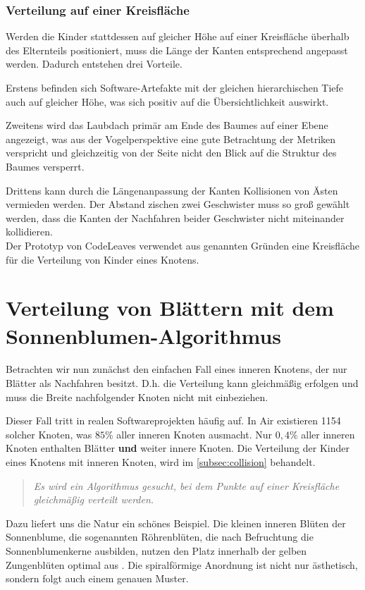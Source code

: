 \subsubsection*{Verteilung auf einer Kreisfläche}
Werden die Kinder stattdessen auf gleicher Höhe auf einer Kreisfläche überhalb des Elternteils positioniert, muss die Länge der Kanten entsprechend angepasst werden. Dadurch entstehen drei Vorteile. 

Erstens befinden sich Software-Artefakte mit der gleichen hierarchischen Tiefe auch auf gleicher Höhe, was sich positiv auf die Übersichtlichkeit auswirkt. 

Zweitens wird das Laubdach primär am Ende des Baumes auf einer Ebene angezeigt, was aus der Vogelperspektive eine gute Betrachtung der Metriken verspricht und gleichzeitig von der Seite nicht den Blick auf die Struktur des Baumes versperrt. 

Drittens kann durch die Längenanpassung der Kanten Kollisionen von Ästen vermieden werden. Der Abstand zischen zwei Geschwister muss so groß gewählt werden, dass die Kanten der Nachfahren beider Geschwister nicht miteinander kollidieren.\\

Der Prototyp von CodeLeaves verwendet aus genannten Gründen eine Kreisfläche für die Verteilung von Kinder eines Knotens.

\section{Verteilung von Blättern mit dem Sonnenblumen-Algorithmus}
\label{sec:sunflower}

Betrachten wir nun zunächst den einfachen Fall eines inneren Knotens, der nur Blätter als Nachfahren besitzt. D.h. die Verteilung kann gleichmäßig erfolgen und muss die Breite nachfolgender Knoten nicht mit einbeziehen.

Dieser Fall tritt in realen Softwareprojekten häufig auf. In Air existieren 1154 solcher Knoten, was $85\%$ aller inneren Knoten ausmacht. Nur $0,4\%$ aller inneren Knoten enthalten Blätter \textbf{und} weiter innere Knoten. Die Verteilung der Kinder eines Knotens mit inneren Knoten, wird im \ref{subsec:collision} behandelt.

\begin{quote}
  \textit{Es wird ein Algorithmus gesucht, bei dem Punkte auf einer Kreisfläche gleichmäßig verteilt werden.}
\end{quote}

Dazu liefert uns die Natur ein schönes Beispiel. Die kleinen inneren Blüten der Sonnenblume, die sogenannten Röhrenblüten, die nach Befruchtung die Sonnenblumenkerne ausbilden, nutzen den Platz innerhalb der gelben Zungenblüten optimal aus \cite{zimmermann2017sonnenblume}. Die spiralförmige Anordnung ist nicht nur ästhetisch, sondern folgt auch einem genauen Muster.

